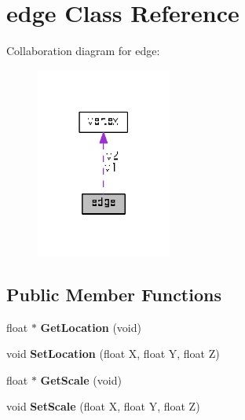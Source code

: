 \hypertarget{classedge}{}\section{edge Class Reference}
\label{classedge}


Collaboration diagram for edge\+:\nopagebreak
\begin{figure}[H]
\begin{center}
\leavevmode
\includegraphics[width=126pt]{classedge__coll__graph}
\end{center}
\end{figure}
\subsection*{Public Member Functions}
\begin{DoxyCompactItemize}
\item 
\mbox{\label{classedge_adad9b84c050f0205df79330003db9a8e}} 
float $\ast$ {\bfseries Get\+Location} (void)
\item 
\mbox{\label{classedge_ab446f29f3631c806e271c7146f149508}} 
void {\bfseries Set\+Location} (float X, float Y, float Z)
\item 
\mbox{\label{classedge_aa04ed891daf5fa70f3ee699e555e5cef}} 
float $\ast$ {\bfseries Get\+Scale} (void)
\item 
\mbox{\label{classedge_aed961c0636e11338bdc7414cd9a3f1f5}} 
void {\bfseries Set\+Scale} (float X, float Y, float Z)
\end{DoxyCompactItemize}
